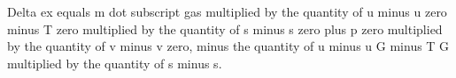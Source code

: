 Delta ex equals m dot subscript gas multiplied by the quantity of u minus u zero minus T zero multiplied by the quantity of s minus s zero plus p zero multiplied by the quantity of v minus v zero, minus the quantity of u minus u G minus T G multiplied by the quantity of s minus s.